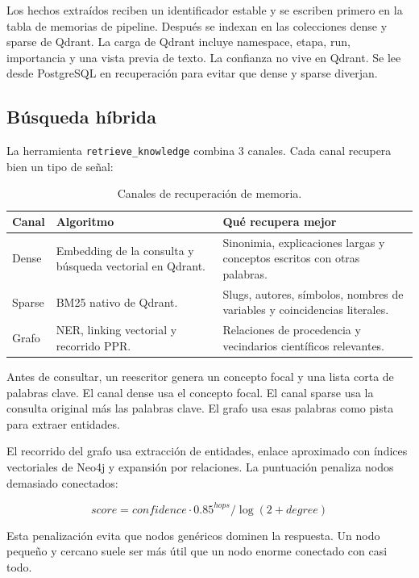 Los hechos extraídos reciben un identificador estable y se escriben primero en
la tabla de memorias de pipeline. Después se indexan en las colecciones dense y
sparse de Qdrant. La carga de Qdrant incluye namespace, etapa, run, importancia
y una vista previa de texto. La confianza no vive en Qdrant. Se lee desde
PostgreSQL en recuperación para evitar que dense y sparse diverjan.

\subsection{Búsqueda híbrida}

La herramienta \texttt{retrieve\_knowledge} combina 3 canales. Cada canal
recupera bien un tipo de señal:

\begin{table}[H]
\begin{center}
\small
\begin{tabular}{|p{2.5cm}|p{4.1cm}|p{5.7cm}|} \hline
\textbf{Canal} & \textbf{Algoritmo} & \textbf{Qué recupera mejor} \\ \hline
Dense & Embedding de la consulta y búsqueda vectorial en Qdrant. & Sinonimia, explicaciones largas y conceptos escritos con otras palabras. \\ \hline
Sparse & BM25 nativo de Qdrant. & Slugs, autores, símbolos, nombres de variables y coincidencias literales. \\ \hline
Grafo & NER, linking vectorial y recorrido PPR. & Relaciones de procedencia y vecindarios científicos relevantes. \\ \hline
\end{tabular}
\caption{Canales de recuperación de memoria.}
\end{center}
\end{table}

Antes de consultar, un reescritor genera un concepto focal y una lista corta de
palabras clave. El canal dense usa el concepto focal. El canal sparse usa la
consulta original más las palabras clave. El grafo usa esas palabras como pista
para extraer entidades.

El recorrido del grafo usa extracción de entidades, enlace aproximado con
índices vectoriales de Neo4j y expansión por relaciones. La puntuación penaliza
nodos demasiado conectados:

\[
score = confidence \cdot 0.85^{hops} / \log(2 + degree)
\]

Esta penalización evita que nodos genéricos dominen la respuesta. Un nodo
pequeño y cercano suele ser más útil que un nodo enorme conectado con casi
todo.

